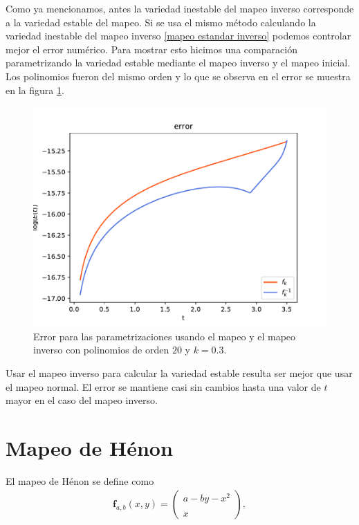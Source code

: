 Como ya mencionamos, antes la variedad inestable del mapeo inverso corresponde a la variedad estable del mapeo. Si se usa el mismo método calculando la variedad inestable del mapeo inverso \eqref{mapeo estandar inverso} podemos controlar mejor el error numérico. Para mostrar esto hicimos una comparación parametrizando la variedad estable mediante el mapeo inverso y el mapeo inicial. Los polinomios fueron del mismo orden y lo que se observa en el error se muestra en la figura \ref{erroresinverso}.


\begin{figure}[H]
\centering
\includegraphics[scale=0.7]{error_inversa}
\caption{Error para las parametrizaciones usando el mapeo y el mapeo inverso con polinomios de orden $20$ y $k=0.3$. }
\label{erroresinverso}
\end{figure}

Usar el mapeo inverso para calcular la variedad estable resulta ser mejor que usar el mapeo normal. El error se mantiene casi sin cambios hasta una valor de $t$ mayor en el caso del mapeo inverso. 




\label{henon-seccion}\section{Mapeo de Hénon}
El mapeo de Hénon se define como \cite{devaney}
\begin{eqnarray}
\mathbf{f}_{a,b}(x,y)=\left( \begin{array}{lcc}
             a-by-x^{2}\\
             \\ x
             \end{array}
             \right), \label{Henon}
\end{eqnarray}

